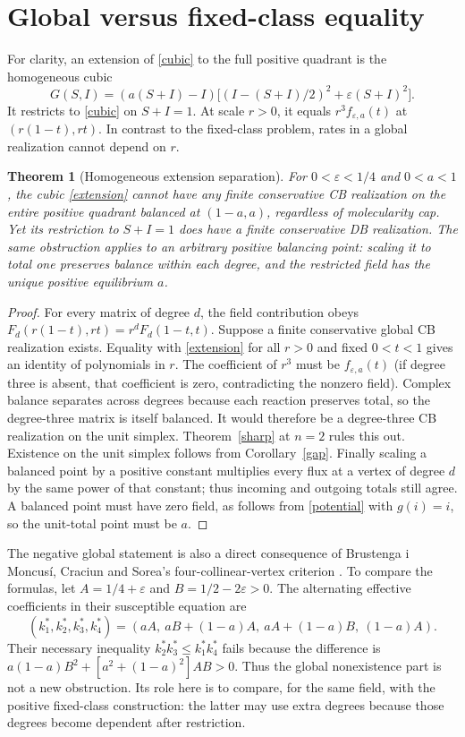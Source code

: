\documentclass[11pt]{article}
\newtheorem{theorem}{Theorem}[section]
\begin{document}
\section{Global versus fixed-class equality}\label{sec:global}
For clarity, an extension of \eqref{cubic} to the full positive quadrant is the homogeneous cubic
\begin{equation}\label{extension}
G(S,I)=(a(S+I)-I)\big[(I-(S+I)/2)^2+\varepsilon(S+I)^2\big].
\end{equation}
It restricts to \eqref{cubic} on $S+I=1$. At scale $r>0$, it equals $r^3f_{\varepsilon,a}(t)$ at $(r(1-t),rt)$. In contrast to the fixed-class problem, rates in a global realization cannot depend on $r$.
\begin{theorem}[Homogeneous extension separation]\label{sep}
For $0<\varepsilon<1/4$ and $0<a<1$, the cubic \eqref{extension} cannot have any finite conservative CB realization on the entire positive quadrant balanced at $(1-a,a)$, regardless of molecularity cap. Yet its restriction to $S+I=1$ does have a finite conservative DB realization. The same obstruction applies to an arbitrary positive balancing point: scaling it to total one preserves balance within each degree, and the restricted field has the unique positive equilibrium $a$.
\end{theorem}
\begin{proof}
For every matrix of degree $d$, the field contribution obeys $F_d(r(1-t),rt)=r^d F_d(1-t,t)$. Suppose a finite conservative global CB realization exists. Equality with \eqref{extension} for all $r>0$ and fixed $0<t<1$ gives an identity of polynomials in $r$. The coefficient of $r^3$ must be $f_{\varepsilon,a}(t)$ (if degree three is absent, that coefficient is zero, contradicting the nonzero field). Complex balance separates across degrees because each reaction preserves total, so the degree-three matrix is itself balanced. It would therefore be a degree-three CB realization on the unit simplex. Theorem~\ref{sharp} at $n=2$ rules this out. Existence on the unit simplex follows from Corollary~\ref{gap}. Finally scaling a balanced point by a positive constant multiplies every flux at a vertex of degree $d$ by the same power of that constant; thus incoming and outgoing totals still agree. A balanced point must have zero field, as follows from \eqref{potential} with $g(i)=i$, so the unit-total point must be $a$.
\end{proof}
The negative global statement is also a direct consequence of Brustenga i Moncus\'i, Craciun and Sorea's four-collinear-vertex criterion \cite[Theorem~4.3, Eq.~(4.2)]{disguised}. To compare the formulas, let $A=1/4+\varepsilon$ and $B=1/2-2\varepsilon>0$. The alternating effective coefficients in their susceptible equation are
\[
 (k_1^*,k_2^*,k_3^*,k_4^*)=
 (aA,\ aB+(1-a)A,\ aA+(1-a)B,\ (1-a)A).
\]
Their necessary inequality $k_2^*k_3^*\le k_1^*k_4^*$ fails because the difference is $a(1-a)B^2+[a^2+(1-a)^2]AB>0$. Thus the global nonexistence part is not a new obstruction. Its role here is to compare, for the same field, with the positive fixed-class construction: the latter may use extra degrees because those degrees become dependent after restriction.
\end{document}
